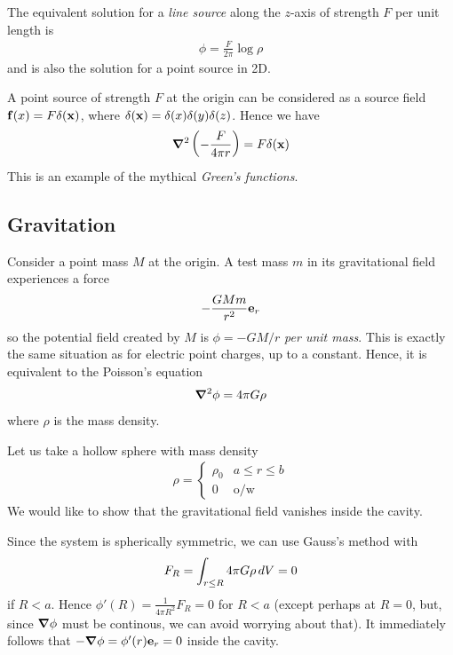 \documentclass{../../template/note}
\begin{document}
    The equivalent solution for a \emph{line source} along the \(z\)-axis of strength \(F\) per unit length is
    \begin{align*}
        \phi = \frac{F}{2\pi} \log \rho
    \end{align*}
    and is also the solution for a point source in 2D.
    
    \begin{remark*}
        A point source of strength \(F\) at the origin can be considered as a source field \(\V f(x) = F \delta(\V x)\), where \(\delta(\V x) = \delta(x)\delta(y)\delta(z)\). Hence we have
        \begin{align*}
            \grad^2 \left(-\frac{F}{4\pi r}\right) = F \delta(\V x)
        \end{align*}
        This is an example of the mythical \emph{Green's functions}.
    \end{remark*}
    
    \subsection{Gravitation}

    Consider a point mass \(M\) at the origin. A test mass \(m\) in its gravitational field experiences a force
    \begin{align*}
        -\frac{GMm}{r^2} \V e_r
    \end{align*}
    so the potential field created by \(M\) is \(\phi = -GM/r\) \emph{per unit mass}. This is exactly the same situation as for electric point charges, up to a constant. Hence, it is equivalent to the Poisson's equation
    \begin{align*}
        \grad^2 \phi = 4\pi G \rho
    \end{align*}
    where \(\rho\) is the mass density.

    \begin{example*}
        Let us take a hollow sphere with mass density
        \begin{align*}
            \rho = \begin{cases}
                \rho_0 & a \leq r \leq b \\
                0 & \text{o/w}
            \end{cases}
        \end{align*}
        We would like to show that the gravitational field vanishes inside the cavity.
    
        Since the system is spherically symmetric, we can use Gauss's method with
        \begin{align*}
            F_R = \int_{r \leq R} 4\pi G \rho \,d{V} = 0
        \end{align*}
        if \(R < a\). Hence \(\phi'(R) = \frac{1}{4\pi R^2}F_R = 0\) for \(R < a\) (except perhaps at \(R=0\), but, since \(\grad \phi\) must be continous, we can avoid worrying about that). It immediately follows that \(-\grad \phi = \phi'(r) \V e_r = 0\) inside the cavity.
    \end{example*}
    
\end{document}
